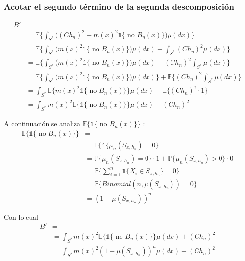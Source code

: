 \documentclass[12pt, a4paper]{article}
\begin{document}
\subsubsection{Acotar el segundo término de la segunda descomposición}

$$
\begin{aligned}
  B' &= \\
  &= \mathds{E} \Bigg\{ \int_{S^{*}} \Big(
    (C h_n)^2 + m(x)^2 \mathds{1}\{ \text{ no } B_n(x) \}
    \Big) \mu(dx) 
  \Bigg\} \\
  &= \mathds{E} \Bigg\{ \int_{S^{*}} \Big(
     m(x)^2 \mathds{1}\{ \text{ no } B_n(x) \}
    \Big) \mu(dx) 
    +
    \int_{S^{*}} (C h_n)^2 \mu(dx) 
  \Bigg\} \\
  &= \mathds{E} \Bigg\{ \int_{S^{*}} \Big(
     m(x)^2 \mathds{1}\{ \text{ no } B_n(x) \}
    \Big) \mu(dx) 
    +
    (C h_n)^2 \int_{S^{*}} \mu(dx) 
  \Bigg\} \\
  &= \mathds{E} \Bigg\{ \int_{S^{*}} \Big(
     m(x)^2 \mathds{1}\{ \text{ no } B_n(x) \}
    \Big) \mu(dx) 
    \Bigg\}
    +
    \mathds{E} \Bigg\{
      (C h_n)^2 \int_{S^{*}} \mu(dx) 
    \Bigg\} \\
  &= \int_{S^{*}} \mathds{E} \bigg\{ 
     m(x)^2 \mathds{1}\{ \text{ no } B_n(x) \}
    \bigg\}
    \mu(dx) 
    +
    \mathds{E} \Bigg\{
      (C h_n)^2 \cdot 1
    \Bigg\} \\
    &= \int_{S^{*}} m(x)^2 \mathds{E} \bigg\{ 
      \mathds{1}\{ \text{ no } B_n(x) \}
    \bigg\}
    \mu(dx) 
    + (C h_n)^2
\end{aligned}
$$

A continuación se analiza $\mathds{E} \bigg\{ 
  \mathds{1}\{ \text{ no } B_n(x) \}
\bigg\}$ :
$$
\begin{aligned}
\mathds{E} \bigg\{ 
      \mathds{1}\{ \text{ no } B_n(x) \}
    \bigg\}&= \\
&= \mathds{E} \bigg\{ 
  \mathds{1}\{
    \mu_n(S_{x,h_n})=0
  \}\\
&= \mathds{P} \bigg\{ 
  \mu_n(S_{x,h_n})=0
\bigg\} \cdot 1 
+ 
\mathds{P} \bigg\{ 
    \mu_n(S_{x,h_n})>0
\bigg\} \cdot 0 \\
&= \mathds{P} \bigg\{ 
  \sum_{i=1}^n \mathds{1} \{ X_i \in S_{x,h_n} \} =0
\bigg\} \\
&= \mathds{P} \bigg\{ 
  Binomial(n,\mu(S_{x,h_n}))=0
\bigg\} \\
&= (1-\mu(S_{x,h_n}))^n
\end{aligned}
$$

Con lo cual
$$
\begin{aligned}
B' &= \\
&= \int_{S^{*}} m(x)^2 \mathds{E} \bigg\{ 
  \mathds{1}\{ \text{ no } B_n(x) \}
\bigg\}
\mu(dx) 
+ (C h_n)^2 \\
&= \int_{S^{*}} m(x)^2 (1-\mu(S_{x,h_n}))^n \mu(dx) 
+ (C h_n)^2
\end{aligned}
$$
\end{document}
